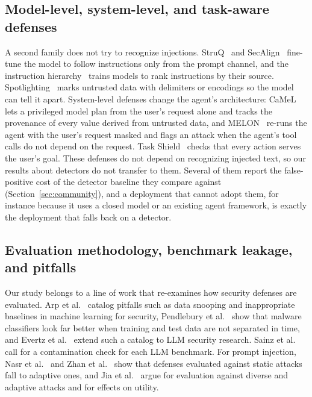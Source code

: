 \subsection{Model-level, system-level, and task-aware defenses}
A second family does not try to recognize injections. StruQ~\cite{struq} and SecAlign~\cite{secalign} fine-tune the model to follow instructions only from the prompt channel, and the instruction hierarchy~\cite{instructionhierarchy} trains models to rank instructions by their source. Spotlighting~\cite{spotlighting} marks untrusted data with delimiters or encodings so the model can tell it apart. System-level defenses change the agent's architecture: CaMeL~\cite{camel} lets a privileged model plan from the user's request alone and tracks the provenance of every value derived from untrusted data, and MELON~\cite{melon} re-runs the agent with the user's request masked and flags an attack when the agent's tool calls do not depend on the request. Task Shield~\cite{taskshield} checks that every action serves the user's goal. These defenses do not depend on recognizing injected text, so our results about detectors do not transfer to them. Several of them report the false-positive cost of the detector baseline they compare against (Section~\ref{sec:community}), and a deployment that cannot adopt them, for instance because it uses a closed model or an existing agent framework, is exactly the deployment that falls back on a detector.

\subsection{Evaluation methodology, benchmark leakage, and pitfalls}
Our study belongs to a line of work that re-examines how security defenses are evaluated. Arp et al.~\cite{arp2022dos} catalog pitfalls such as data snooping and inappropriate baselines in machine learning for security, Pendlebury et al.~\cite{tesseract} show that malware classifiers look far better when training and test data are not separated in time, and Evertz et al.~\cite{chasingshadows} extend such a catalog to LLM security research. Sainz et al.~\cite{sainz2023} call for a contamination check for each LLM benchmark. For prompt injection, Nasr et al.~\cite{attackermovessecond} and Zhan et al.~\cite{zhan2025adaptive} show that defenses evaluated against static attacks fall to adaptive ones, and Jia et al.~\cite{jia2025critical} argue for evaluation against diverse and adaptive attacks and for effects on utility.

